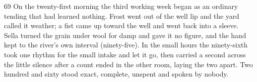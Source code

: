 \begin{CRchronicle}{69}
On the twenty-first morning the third working week began as an ordinary tending that had learned nothing. Frost went out of the well lip and the yard called it weather; a fist came up toward the well and went back into a sleeve. Sella turned the grain under wool for damp and gave it no figure, and the hand kept to the river’s own interval (ninety-five). In the small hours the ninety-sixth took one rhythm for the small intake and let it go, then carried a second across the little silence after a count ended in the other room, laying the two apart. Two hundred and sixty stood exact, complete, unspent and spoken by nobody.
\end{CRchronicle}
